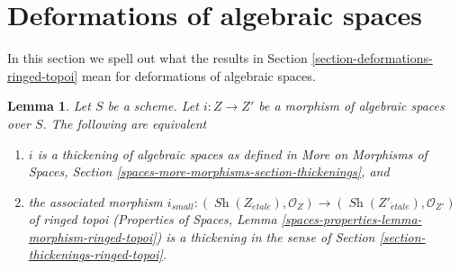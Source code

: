 \documentclass{stacks-project}
\theoremstyle{plain}
\newtheorem{lemma}[subsection]{Lemma}
\theoremstyle{definition}
\theoremstyle{remark}
\numberwithin{equation}{subsection}
\def\Sh{\mathop{\mathit{Sh}}\nolimits}
\def\etale{{\acute{e}tale}}
\begin{document}
\section{Deformations of algebraic spaces}
\label{section-deformations-spaces}

\noindent
In this section we spell out what the results in
Section \ref{section-deformations-ringed-topoi}
mean for deformations of algebraic spaces.

\begin{lemma}
\label{lemma-match-thickenings}
Let $S$ be a scheme. Let $i : Z \to Z'$ be a morphism of algebraic spaces
over $S$. The following are equivalent
\begin{enumerate}
\item $i$ is a thickening of algebraic spaces as defined
in More on Morphisms of Spaces, Section
\ref{spaces-more-morphisms-section-thickenings}, and
\item the associated morphism
$i_{small} : (\Sh(Z_\etale), \mathcal{O}_Z) \to
(\Sh(Z'_\etale), \mathcal{O}_{Z'})$
of ringed topoi (Properties of Spaces, Lemma
\ref{spaces-properties-lemma-morphism-ringed-topoi})
is a thickening in the sense of
Section \ref{section-thickenings-ringed-topoi}.
\end{enumerate}
\end{lemma}
\end{document}
